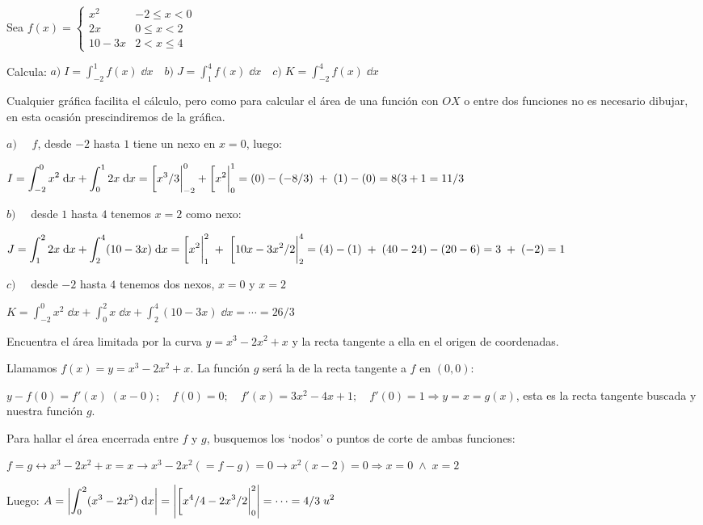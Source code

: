 \begin{ejre}
	Sea $f(x)=\begin{cases}x^2 & -2\le x<0 \\ 2x & 0\le x <2 \\ 10-3x & 2<x\le 4 \end{cases}$
	
	Calcula: $\displaystyle a)\; I=\int_{-2}^1 f(x) \; \dd x \quad b)\; J=\int_{1}^4 f(x) \; \dd x \quad c)\; K=\int_{-2}^4 f(x) \; \dd x $
\end{ejre}

\begin{proofw}\renewcommand{\qedsymbol}{$\diamond$}

Cualquier gráfica facilita el cálculo, pero como para calcular el área de una función con $OX$ o entre dos funciones no es necesario dibujar, en esta ocasión prescindiremos de la gráfica.
	
$\displaystyle a) \quad$ $f$, desde $-2$ hasta $1$ tiene un nexo en $x=0$, luego:

$\displaystyle I=  \int_{-2}^{0} x^2 \; \dd x  + \int_{0}^{1} 2x \; \dd x  = \eval[x^3/3|_{-2}^0 + \eval[x^2|_0^1= (0)-(-8/3) \; +\; (1)-(0)=8(3+1 = 11/3$   


$\displaystyle b) \quad$  desde $1$ hasta $4$ tenemos $x=2$ como nexo:

$\displaystyle J=  \int_{1}^{2} 2x \; \dd x +  \int_{2}^{4} (10-3x) \; \dd x = \eval[x^2|_1^2\; + \; \eval[10x-3x^2/2|_2^4=(4)-(1) \; + \; (40-24)-(20-6)= 3 \; + \; (-2)=1$


$\displaystyle c) \quad$ desde $-2$ hasta $4$ tenemos dos nexos, $x=0$ y $x=2$

$\displaystyle K= \int_{-2}^{0} x^2 \; \dd x +\int_{0}^{2} x \; \dd x +\int_{2}^{4} (10-3x) \; \dd x = \cdots =26/3$
 
\end{proofw}

\begin{ejre}
Encuentra el área limitada por la curva $y=x^3-2x^2+x$ y la recta tangente a ella en el origen de coordenadas.	
\end{ejre}

\begin{proofw}\renewcommand{\qedsymbol}{$\diamond$}	

Llamamos $f(x)=y=	x^3-2x^2+x$. La función $g$ será la de la recta tangente a $f$ en $(0,0)$:

$y-f(0)=f'(x)\; (x-0); \quad f(0)=0; \quad f'(x)=3x^2-4x+1;  \quad f'(0)=1 \Rightarrow y=x=g(x)$, esta es la recta tangente buscada y nuestra función $g$.

Para hallar el área encerrada entre $f$ y $g$, busquemos los `nodos' o puntos de corte de ambas funciones:

$f=g \leftrightarrow x^3-2x^2+x=x \to x^3-2x^2 (=f-g) =0 \to  x^2(x-2)=0 \Rightarrow x=0\; \wedge \; x=2$

Luego:$\; \displaystyle A=\left| \int_0^2 (x^3-2x^2) \; \dd x \right|= \left| \eval[ x^4/4 - 2x^3/2|_0^2 \right|= \cdots = 4/3 \; u^2$ 
\end{proofw}

